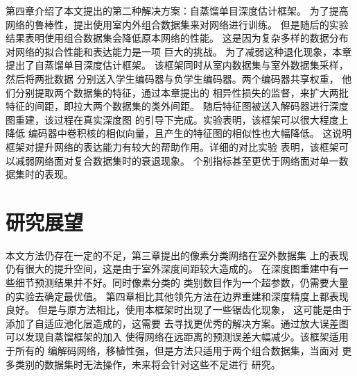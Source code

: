 第四章介绍了本文提出的第二种解决方案：自蒸馏单目深度估计框架。
为了提高网络的鲁棒性，提出使用室内外组合数据集来对网络进行训练。
但是随后的实验结果表明使用组合数据集会降低原本网络的性能。
这是因为复杂多样的数据分布对网络的拟合性能和表达能力是一项
巨大的挑战。
为了减弱这种退化现象，本章提出了自蒸馏单目深度估计框架。
该框架同时从室内数据集与室外数据集采样，然后将两批数据
分别送入学生编码器与负学生编码器。两个编码器共享权重，
他们分别提取两个数据集的特征，通过本章提出的
相异性损失的监督，来扩大两批特征的间距，即拉大两个数据集的类外间距。
随后特征图被送入解码器进行深度图重建，该过程在真实深度图
的引导下完成。实验表明，该框架可以很大程度上降低
编码器中卷积核的相似向量，且产生的特征图的相似性也大幅降低。
这说明框架对提升网络的表达能力有较大的帮助作用。详细的对比实验
表明，该框架可以减弱网络面对复合数据集时的衰退现象。
个别指标甚至更优于网络面对单一数据集时的表现。

\section{研究展望}
本文方法仍存在一定的不足，第三章提出的像素分类网络在室外数据集
上的表现仍有很大的提升空间，这是由于室外深度间距较大造成的。
在深度图重建中有一些细节预测结果并不好。同时像素分类的
类别数目作为一个超参数，仍需要大量的实验去确定最优值。
第四章相比其他领先方法在边界重建和深度精度上都表现良好。
但是与原方法相比，使用本框架时出现了一些锯齿化现象，
这可能是由于添加了自适应池化层造成的，这需要
去寻找更优秀的解决方案。通过放大误差图可以发现自蒸馏框架的加入
使得网络在远距离的预测误差大幅减少。该框架适用于所有的
编解码网络，移植性强，但是方法只适用于两个组合数据集，当面对
更多类别的数据集时无法操作，未来将会针对这些不足进行
研究。